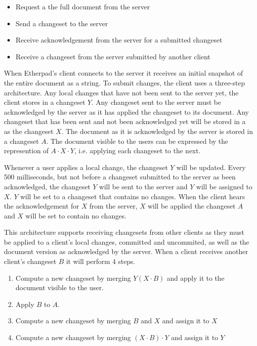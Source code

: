 \begin{itemize}
\item Request a the full document from the server
\item Send a changeset to the server
\item Receive acknowledgement from the server for a submitted changeset
\item Receive a changeset from the server submitted by another client
\end{itemize}

\noindent When Etherpad's client connects to the server it receives an initial snapshot of the entire document as a string. To submit changes, the client uses a three-step architecture. Any local changes that have not been sent to the server yet, the client stores in a changeset $Y$. Any changeset sent to the server must be acknowledged by the server as it has applied  the changeset to its document. Any changeset that has been sent and not been acknowledged yet will be stored in a as the changeset $X$. The document as it is acknowledged by the server is stored in a changeset $A$. The document visible to the users can be expressed by the represention of $A \cdot X \cdot Y$, i.e. applying each changeset to the next.

Whenever a user applies a local change, the changeset $Y$ will be updated. Every 500 milliseconds, but not before a changeset submitted to the server as been acknowledged, the changeset $Y$ will be sent to the server and $Y$ will be assigned to $X$. $Y$ will be set to a changeset that contains no changes. When the client hears the acknowledgement for $X$ from the server, $X$ will be applied the changeset $A$ and $X$ will be set to contain no changes.

This architecture supports receiving changesets from other clients as they must be applied to a client's local changes, committed and uncommited, as well as the document version as acknowledged by the server. When a client receives another client's changeset $B$ it will perform 4 steps.

\begin{enumerate}
\item Compute a new changeset by merging $Y (X \cdot B)$ and apply it to the document visible to the user.
\item Apply $B$ to $A$.
\item Compute a new changeset by merging $B$ and $X$ and assign it to $X$
\item Compute a new changeset by merging $(X \cdot B) \cdot Y$ and assign it to $Y$
\end{enumerate}

